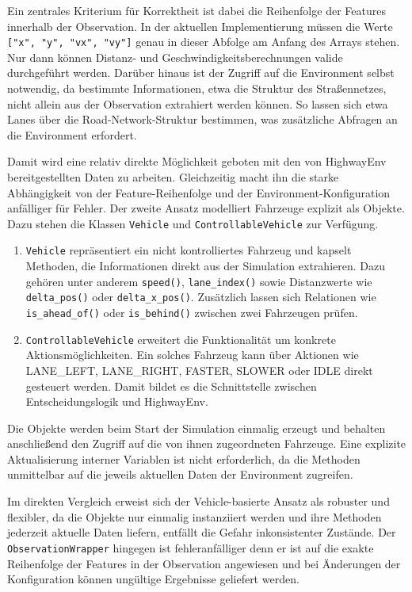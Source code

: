 Ein zentrales Kriterium für Korrektheit ist dabei die Reihenfolge der Features innerhalb der Observation. In der aktuellen Implementierung müssen die Werte \verb|["x", "y", "vx", "vy"]| genau in dieser Abfolge am Anfang des Arrays stehen. Nur dann können Distanz- und Geschwindigkeitsberechnungen valide durchgeführt werden. Darüber hinaus ist der Zugriff auf die Environment selbst notwendig, da bestimmte Informationen, etwa die Struktur des Straßennetzes, nicht allein aus der Observation extrahiert werden können. So lassen sich etwa Lanes über die Road-Network-Struktur bestimmen, was zusätzliche Abfragen an die Environment erfordert. 

Damit wird eine relativ direkte Möglichkeit geboten mit den von HighwayEnv bereitgestellten Daten zu arbeiten. Gleichzeitig macht ihn die starke Abhängigkeit von der Feature-Reihenfolge und der Environment-Konfiguration anfälliger für Fehler.
\newline
\newline
Der zweite Ansatz modelliert Fahrzeuge explizit als Objekte. Dazu stehen die Klassen \texttt{Vehicle} und \texttt{ControllableVehicle} zur Verfügung.
\begin{enumerate}
    \item \texttt{Vehicle} repräsentiert ein nicht kontrolliertes Fahrzeug und kapselt Methoden, die Informationen direkt aus der Simulation extrahieren. Dazu gehören unter anderem \texttt{speed()}, \texttt{lane\_index()} sowie Distanzwerte wie \texttt{delta\_pos()} oder \texttt{delta\_x\_pos()}. Zusätzlich lassen sich Relationen wie \texttt{is\_ahead\_of()} oder \texttt{is\_behind()} zwischen zwei Fahrzeugen prüfen.
    \item \texttt{ControllableVehicle} erweitert die Funktionalität um konkrete Aktionsmöglichkeiten. Ein solches Fahrzeug kann über Aktionen wie LANE\_LEFT, LANE\_RIGHT, FASTER, SLOWER oder IDLE direkt gesteuert werden. Damit bildet es die Schnittstelle zwischen Entscheidungslogik und HighwayEnv.
\end{enumerate}

Die Objekte werden beim Start der Simulation einmalig erzeugt und behalten anschließend den Zugriff auf die von ihnen zugeordneten Fahrzeuge. Eine explizite Aktualisierung interner Variablen ist nicht erforderlich, da die Methoden unmittelbar auf die jeweils aktuellen Daten der Environment zugreifen.

Im direkten Vergleich erweist sich der Vehicle-basierte Ansatz als robuster und flexibler, da die Objekte nur einmalig instanziiert werden und ihre Methoden jederzeit aktuelle Daten liefern, entfällt die Gefahr inkonsistenter Zustände. Der \texttt{ObservationWrapper} hingegen ist fehleranfälliger denn er ist auf die exakte Reihenfolge der Features in der Observation angewiesen und bei Änderungen der Konfiguration können ungültige Ergebnisse geliefert werden.

